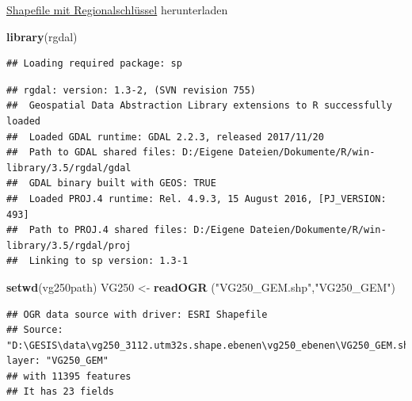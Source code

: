 \documentclass[ignorenonframetext,]{beamer}
\newenvironment{Shaded}{\begin{snugshade}}{\end{snugshade}}
\newcommand{\KeywordTok}[1]{\textcolor[rgb]{0.13,0.29,0.53}{\textbf{#1}}}
\newcommand{\NormalTok}[1]{#1}
\newcommand{\StringTok}[1]{\textcolor[rgb]{0.31,0.60,0.02}{#1}}
\begin{document}
\begin{frame}[fragile]{\href{http://www.geodatenzentrum.de/geodaten/gdz_rahmen.gdz_div?gdz_spr=deu\&gdz_akt_zeile=5\&gdz_anz_zeile=1\&gdz_unt_zeile=13\&gdz_user_id=0}{Shapefile
mit Regionalschlüssel} herunterladen}
\protect\hypertarget{shapefile-mit-regionalschlussel-herunterladen}{}

\begin{Shaded}
\begin{Highlighting}[]
\KeywordTok{library}\NormalTok{(rgdal)}
\end{Highlighting}
\end{Shaded}

\begin{verbatim}
## Loading required package: sp
\end{verbatim}

\begin{verbatim}
## rgdal: version: 1.3-2, (SVN revision 755)
##  Geospatial Data Abstraction Library extensions to R successfully loaded
##  Loaded GDAL runtime: GDAL 2.2.3, released 2017/11/20
##  Path to GDAL shared files: D:/Eigene Dateien/Dokumente/R/win-library/3.5/rgdal/gdal
##  GDAL binary built with GEOS: TRUE 
##  Loaded PROJ.4 runtime: Rel. 4.9.3, 15 August 2016, [PJ_VERSION: 493]
##  Path to PROJ.4 shared files: D:/Eigene Dateien/Dokumente/R/win-library/3.5/rgdal/proj
##  Linking to sp version: 1.3-1
\end{verbatim}

\begin{Shaded}
\begin{Highlighting}[]
\KeywordTok{setwd}\NormalTok{(vg250path)}
\NormalTok{VG250 <-}\StringTok{ }\KeywordTok{readOGR}\NormalTok{ (}\StringTok{"VG250_GEM.shp"}\NormalTok{,}\StringTok{"VG250_GEM"}\NormalTok{)}
\end{Highlighting}
\end{Shaded}

\begin{verbatim}
## OGR data source with driver: ESRI Shapefile 
## Source: "D:\GESIS\data\vg250_3112.utm32s.shape.ebenen\vg250_ebenen\VG250_GEM.shp", layer: "VG250_GEM"
## with 11395 features
## It has 23 fields
\end{verbatim}

\end{frame}
\end{document}
